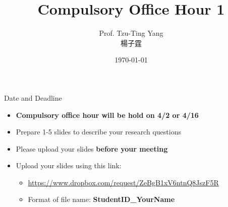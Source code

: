 \documentclass[hyperref={pdfpagelabels=false}]{beamer}
\title[]  
{Compulsory Office Hour 1}
\author 
{Prof. Tzu-Ting Yang  \\ 楊子霆}
\institute{Institute of Economics, Academia Sinica  \\ 中央研究院經濟研究所}
\date
{\today}
\begin{document}
\begin{frame}{}
 \titlepage
\end{frame}



\begin{frame}{Date and Deadline}
\begin{itemize} 
\item \textbf{Compulsory office hour will be hold on 4/2 or 4/16} 
\vspace{0.2cm}
\item Prepare 1-5 slides to describe your research questions 
\vspace{0.2cm}
\item Please upload your slides \textbf{before your meeting}
\vspace{0.2cm}
\item Upload your slides using this link:
\vspace{0.2cm}
\begin{itemize} 
\item \url{https://www.dropbox.com/request/ZeBgB1xV6ntnQ8JszF5R}
	\vspace{0.2cm}
\item Format of file name: \textbf{StudentID\_YourName}
\vspace{0.2cm}

\end{itemize}

\end{itemize}
\end{frame}
\end{document}
